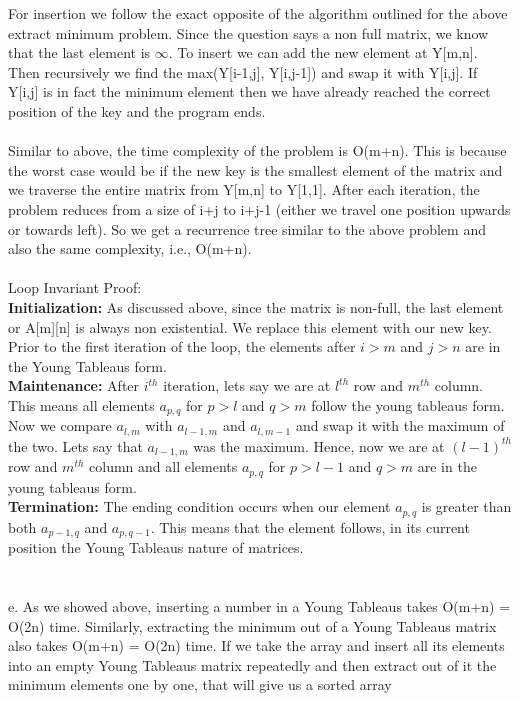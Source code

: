 \documentclass[10pt]{article}
\begin{document}
For insertion we follow the exact opposite of the algorithm outlined for the above extract minimum problem. Since the question says a non full matrix, we know that the last element is $\infty$. To insert we can add the new element at Y[m,n]. Then recursively we find the max(Y[i-1,j], Y[i,j-1]) and swap it with Y[i,j]. If Y[i,j] is in fact the minimum element then we have already reached the correct position of the key and the program ends.\\\\
Similar to above, the time complexity of the problem is O(m+n). This is because the worst case would be if the new key is the smallest element of the matrix and we traverse the entire matrix from Y[m,n] to Y[1,1]. After each iteration, the problem reduces from a size of i+j to i+j-1 (either we travel one position upwards or towards left). So we get a recurrence tree similar to the above problem and also the same complexity, i.e., O(m+n).\\\\
Loop Invariant Proof:\\
\textbf{Initialization:} As discussed above, since the matrix is non-full, the last element or A[m][n] is always non existential. We replace this element with our new key. Prior to the first iteration of the loop, the elements after $i>m$ and $j>n$ are in the Young Tableaus form.\\
\textbf{Maintenance:} After $i^{th}$ iteration, lets say we are at $l^{th}$ row and $m^{th}$ column. This means all elements $a_{p,q}$ for $p>l$ and $q>m$ follow the young tableaus form. Now we compare $a_{l,m}$ with $a_{l-1,m}$ and $a_{l,m-1}$ and swap it with the maximum of the two. Lets say that $a_{l-1,m}$ was the maximum. Hence, now we are at $(l-1)^{th}$ row and $m^{th}$ column and all elements $a_{p,q}$ for $p>l-1$ and $q>m$ are in the young tableaus form.\\
\textbf{Termination:} The ending condition occurs when our element $a_{p,q}$ is greater than both $a_{p-1,q}$ and $a_{p,q-1}$. This means that the element follows, in its current position the Young Tableaus nature of matrices.\\\\\\
e. As we showed above, inserting a number in a Young Tableaus takes O(m+n) = O(2n) time. Similarly, extracting the minimum out of a Young Tableaus matrix also takes O(m+n) = O(2n) time. If we take the array and insert all its elements into an empty Young Tableaus matrix repeatedly and then extract out of it the minimum elements one by one, that will give us a sorted array\\
\end{document}
